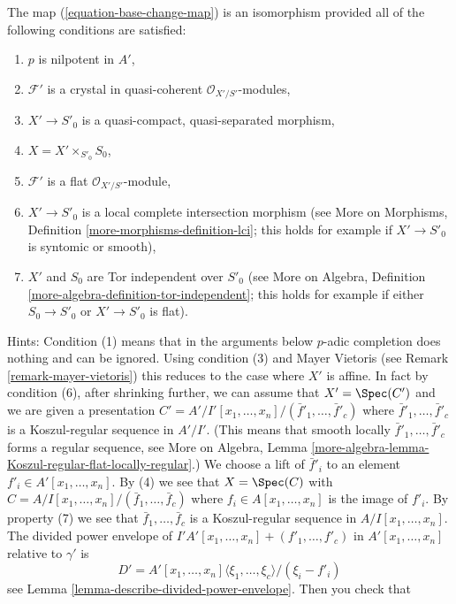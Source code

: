 \begin{remark}
\label{remark-base-change-isomorphism}
The map (\ref{equation-base-change-map}) is an isomorphism provided
all of the following conditions are satisfied:
\begin{enumerate}
\item $p$ is nilpotent in $A'$,
\item $\mathcal{F}'$ is a crystal in quasi-coherent
$\mathcal{O}_{X'/S'}$-modules,
\item $X' \to S'_0$ is a quasi-compact, quasi-separated morphism,
\item $X = X' \times_{S'_0} S_0$,
\item $\mathcal{F}'$ is a flat $\mathcal{O}_{X'/S'}$-module,
\item $X' \to S'_0$ is a local complete intersection morphism (see
More on Morphisms, Definition \ref{more-morphisms-definition-lci}; this
holds for example if $X' \to S'_0$ is syntomic or smooth),
\item $X'$ and $S_0$ are Tor independent over $S'_0$ (see
More on Algebra, Definition \ref{more-algebra-definition-tor-independent};
this holds for example if either $S_0 \to S'_0$ or $X' \to S'_0$ is flat).
\end{enumerate}
Hints: Condition (1) means that in the arguments below $p$-adic completion
does nothing and can be ignored.
Using condition (3) and Mayer Vietoris (see
Remark \ref{remark-mayer-vietoris}) this reduces to the case
where $X'$ is affine. In fact by condition (6), after shrinking
further, we can assume that $X' = \Spec(C')$ and we are given a presentation
$C' = A'/I'[x_1, \ldots, x_n]/(\bar f'_1, \ldots, \bar f'_c)$
where $\bar f'_1, \ldots, \bar f'_c$ is a Koszul-regular sequence in $A'/I'$.
(This means that smooth locally $\bar f'_1, \ldots, \bar f'_c$ forms
a regular sequence, see More on Algebra,
Lemma \ref{more-algebra-lemma-Koszul-regular-flat-locally-regular}.)
We choose a lift of
$\bar f'_i$ to an element $f'_i \in A'[x_1, \ldots, x_n]$. By (4) we see that
$X = \Spec(C)$ with $C = A/I[x_1, \ldots, x_n]/(\bar f_1, \ldots, \bar f_c)$
where $f_i \in A[x_1, \ldots, x_n]$ is the image of $f'_i$.
By property (7) we see that $\bar f_1, \ldots, \bar f_c$ is a Koszul-regular
sequence in $A/I[x_1, \ldots, x_n]$. The divided power envelope of
$I'A'[x_1, \ldots, x_n] + (f'_1, \ldots, f'_c)$ in $A'[x_1, \ldots, x_n]$
relative to $\gamma'$ is
$$
D' = A'[x_1, \ldots, x_n]\langle \xi_1, \ldots, \xi_c \rangle/(\xi_i - f'_i)
$$
see Lemma \ref{lemma-describe-divided-power-envelope}. Then you check that

\end{remark}
